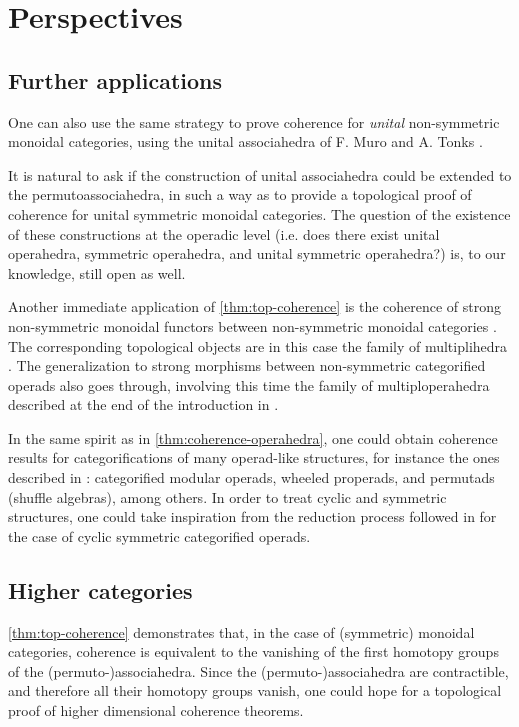 
\section{Perspectives}


\subsection{Further applications} 
\label{sec:further}
One can also use the same strategy to prove coherence for \emph{unital} non-symmetric monoidal categories, using the unital associahedra of F. Muro and A. Tonks \cite{muroUnitalAssociahedra2014}.

It is natural to ask if the construction of unital associahedra could be extended to the permutoassociahedra, in such a way as to provide a topological proof of coherence for unital symmetric monoidal categories. 
The question of the existence of these constructions at the operadic level (i.e. does there exist unital operahedra, symmetric operahedra, and unital symmetric operahedra?) is, to our knowledge, still open as well. 

Another immediate application of \cref{thm:top-coherence} is the coherence of strong non-symmetric monoidal functors between non-symmetric monoidal categories \cite{epsteinFunctorsTensoredCategories1966}. 
The corresponding topological objects are in this case the family of multiplihedra \cite{Stasheff70,Forcey08}.
The generalization to strong morphisms between non-symmetric categorified operads also goes through, involving this time the family of multiploperahedra described at the end of the introduction in \cite{MazuirLA22}.

In the same spirit as in \cref{thm:coherence-operahedra}, one could obtain coherence results for categorifications of many operad-like structures, for instance the ones described in \cite{BMO20}: categorified modular operads, wheeled properads, and permutads (shuffle algebras), among others.
In order to treat cyclic and symmetric structures, one could take inspiration from the reduction process followed in \cite{curienCategorifiedCyclicOperads2020} for the case of cyclic symmetric categorified operads.

\subsection{Higher categories} 
\label{sec:higher}
\cref{thm:top-coherence} demonstrates that, in the case of (symmetric) monoidal categories, coherence is equivalent to the vanishing of the first homotopy groups of the (permuto-)associahedra. 
Since the (permuto-)associahedra are contractible, and therefore all their homotopy groups vanish, one could hope for a topological proof of higher dimensional coherence theorems.

